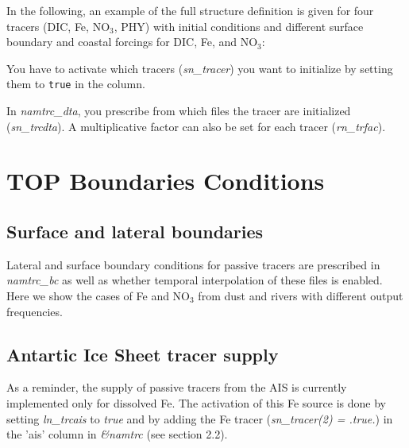 \documentclass[../main/TOP_manual]{subfiles}
\begin{document}
In the following, an example of the full structure definition is given for four tracers (DIC, Fe, NO$_{3}$, PHY) with initial conditions and different surface boundary and coastal forcings for DIC, Fe, and NO$_{3}$: 


You have to activate which tracers (\textit{sn\_tracer}) you want to initialize by setting them to \texttt{true} in the  column. 


In \textit{namtrc\_dta}, you prescribe from which files the tracer are initialized (\textit{sn\_trcdta}). 
A multiplicative factor can also be set for each tracer (\textit{rn\_trfac}). 


\section{ TOP Boundaries Conditions}

\subsection{Surface and lateral boundaries}

Lateral and surface boundary conditions for passive tracers are prescribed in \textit{namtrc\_bc} as well as whether temporal interpolation of these files is enabled. Here we show the cases of Fe and NO$_{3}$ from dust and rivers with different output frequencies.
 

\subsection{Antartic Ice Sheet tracer supply}

As a reminder, the supply of passive tracers from the AIS is currently implemented only for dissolved Fe. The activation of this Fe source is done by setting \textit{ln\_trcais} to \textit{true} and by adding the Fe tracer (\textit{sn\_tracer(2) = .true.}) in the 'ais' column in \textit{\&namtrc} (see section 2.2). \\
\end{document}
